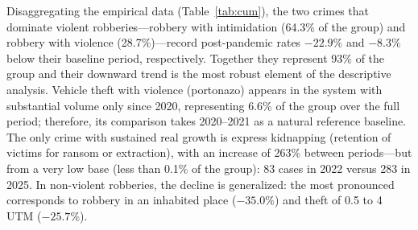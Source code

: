 \documentclass[pdflatex,sn-basic]{sn-jnl}
\begin{document}
Disaggregating the empirical data (Table~\ref{tab:cum}), the two crimes that dominate violent
robberies---robbery with intimidation (64.3\% of the group) and robbery with
violence (28.7\%)---record post-pandemic rates $-22.9\%$ and $-8.3\%$ below their
baseline period, respectively. Together they represent 93\% of the group
and their downward trend is the most robust element of the descriptive analysis.
Vehicle theft with violence (portonazo) appears in the system with substantial volume only since 2020,
representing 6.6\% of the group over the full period; therefore, its comparison takes 2020--2021 as a natural reference
baseline. The only crime with
sustained real growth is express kidnapping (retention of victims for ransom or extraction),
with an increase of 263\% between periods---but from a very low base (less
than 0.1\% of the group): 83 cases in 2022 versus 283 in 2025. In non-violent robberies,
the decline is generalized: the most pronounced corresponds to robbery in an inhabited place
($-35.0\%$) and theft of 0.5 to 4 UTM ($-25.7\%$).
\end{document}
